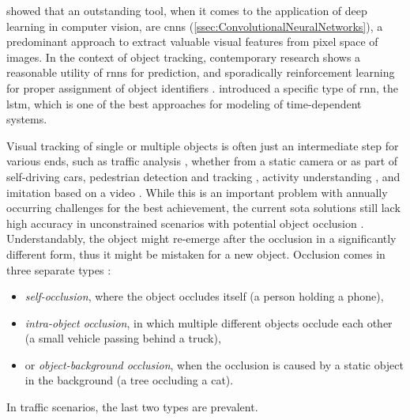 \cite{Krizhevsky2012} showed that an outstanding tool, when it comes to the application of deep learning in computer vision, are \glspl{cnn} (\cref{ssec:ConvolutionalNeuralNetworks}), a predominant approach to extract valuable visual features from pixel space of images. In the context of object tracking, contemporary research shows a reasonable utility of \glspl{rnn} \cite{rumelhart:errorpropnonote} for prediction, and sporadically reinforcement learning for proper assignment of object identifiers \cite{Zhang2017}. \cite{Hochreiter1997} introduced a specific type of \gls{rnn}, the \gls{lstm}, which is one of the best approaches for modeling of time-dependent systems.

Visual tracking of single or multiple objects is often just an intermediate step for various ends, such as traffic analysis \cite{Tang2019}, whether from a static camera or as part of self-driving cars, pedestrian detection and tracking \cite{Leal-Taixe2017}, activity understanding \cite{DBLP:journals/corr/abs-1709-04905}, and imitation based on a video \cite{2018-TOG-SFV}. While this is an important problem with annually occurring challenges for the best achievement, the current \gls{sota} solutions still lack high accuracy in unconstrained scenarios with potential object occlusion \cite{Jiyan2007}. Understandably, the object might re-emerge after the occlusion in a significantly different form, thus it might be mistaken for a new object. Occlusion comes in three separate types \cite{gabriel2003state}:

\begin{itemize}
    \item \emph{self-occlusion}, where the object occludes itself (a person holding a phone),
    \item \emph{intra-object occlusion}, in which multiple different objects occlude each other (a small vehicle passing behind a truck),
    \item or \emph{object-background occlusion}, when the occlusion is caused by a static object in the background (a tree occluding a cat).
\end{itemize}

\noindent In traffic scenarios, the last two types are prevalent.

